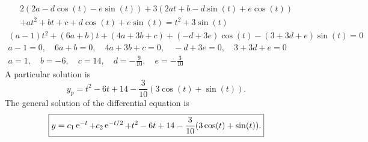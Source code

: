 {\begin{Solution}
\begin{enumerate}
\[    \]
    \begin{multline*}
      2 ( 2 a - d \cos(t) - e \sin(t) )
      + 3 ( 2 a t + b - d \sin(t) + e \cos(t) ) \\
      + a t^2 + b t + c + d \cos(t) + e \sin(t) = t^2 + 3 \sin(t)
    \end{multline*}
    \begin{gather*}
      (a - 1) t^2 + (6 a + b) t + (4 a + 3 b + c) + (-d + 3 e) \cos(t)
      - (3 + 3 d + e) \sin(t) = 0 \\
      a - 1 = 0, \quad 6 a + b = 0, \quad 4 a + 3 b + c = 0, \quad 
      -d + 3 e = 0, \quad 3 + 3 d + e = 0 \\
      a = 1, \quad b = -6, \quad c = 14, \quad d = - \frac{9}{10}, 
      \quad e = - \frac{3}{10}
    \end{gather*}
    A particular solution is
    \[
    y_p = t^2 - 6 t + 14 - \frac{3}{10} ( 3 \cos(t) + \sin(t) ).
    \]
    The general solution of the differential equation is
    \[
    \boxed{
      y = c_1 \mathop{\mathrm{e}}\nolimits^{-t} + c_2 \mathop{\mathrm{e}}\nolimits^{-t/2}
      + t^2 - 6 t + 14 - \frac{3}{10} ( 3 \cos(t) + \sin(t) ).
      }
    \]
  \end{enumerate}
\end{Solution}







}
